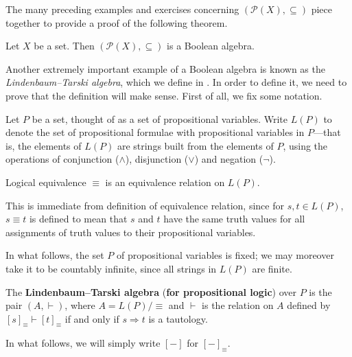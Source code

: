 The many preceding examples and exercises concerning $(\mathcal{P}(X), \subseteq)$ piece together to provide a proof of the following theorem.

\begin{theorem}
\label{thmPowerSetIsBooleanAlgebra}
Let $X$ be a set. Then $(\mathcal{P}(X), \subseteq)$ is a Boolean algebra.
\end{theorem}

Another extremely important example of a Boolean algebra is known as the \textit{Lindenbaum--Tarski algebra}, which we define in . In order to define it, we need to prove that the definition will make sense. First of all, we fix some notation.

\begin{definition}
Let $P$ be a set, thought of as a set of propositional variables. Write $L(P)$ to denote the set of propositional formulae with propositional variables in $P$---that is, the elements of $L(P)$ are strings built from the elements of $P$, using the operations of conjunction ($\wedge$), disjunction ($\vee$) and negation ($\neg$).
\end{definition}

\begin{lemma}
Logical equivalence $\equiv$ is an equivalence relation on $L(P)$.
\end{lemma}
\begin{cproof}
This is immediate from definition of equivalence relation, since for $s,t \in L(P)$, $s \equiv t$ is defined to mean that $s$ and $t$ have the same truth values for all assignments of truth values to their propositional variables.
\end{cproof}

In what follows, the set $P$ of propositional variables is fixed; we may moreover take it to be countably infinite, since all strings in $L(P)$ are finite.

\begin{definition}
\label{defLindenbaumTarskiAlgebra}
The \textbf{Lindenbaum--Tarski algebra} (\textbf{for propositional logic}) over $P$ is the pair $(A, \vdash)$, where $A = L(P)/{\equiv}$ and $\vdash$ is the relation on $A$ defined by $[s]_{\equiv} \vdash [t]_{\equiv}$ if and only if $s \Rightarrow t$ is a tautology.
\end{definition}

In what follows, we will simply write $[{-}]$ for $[{-}]_{\equiv}$.


